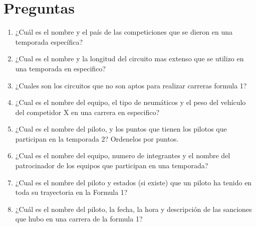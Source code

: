 \documentclass{article}
\begin{document}
	\section{Preguntas}
	\begin{enumerate}
		\item ¿Cuál es el nombre y el país de las competiciones que se dieron en una temporada específica?
		\item ¿Cual es el nombre y la longitud del circuito mas extenso que se utilizo en una temporada en especifico?
		\item ¿Cuales son los circuitos que no son aptos para realizar carreras formula 1?
		\item ¿Cual es el nombre del equipo, el tipo de neumáticos y el peso del vehículo del competidor X en una carrera en especifico?
		\item ¿Cual es el nombre del piloto, y los puntos que tienen los pilotos que participan en la temporada 2? Ordenelos por puntos.
		\item ¿Cual es el nombre del equipo, numero de integrantes y el nombre del patrocinador de los equipos que participan en una temporada?
		\item ¿Cual es el nombre del piloto y estados (si existe) que un piloto ha tenido en toda su trayectoria en la Formula 1?
		\item ¿Cuál es el nombre del piloto, la fecha, la hora y descripción de las sanciones que hubo en una carrera de la formula 1?
		

\end{enumerate}
\end{document}
